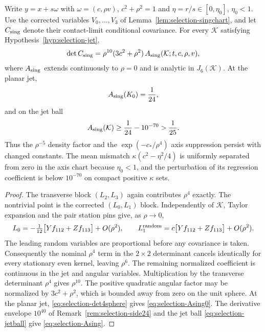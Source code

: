 \begin{lemma}\label{lem:selection-singfactor}
Write $y=x+s\omega$ with $\omega=(c,\rho v)$, $c^2+\rho^2=1$ and $\eta=r/s\in[0,\eta_0]$, $\eta_0<1$. Use the corrected variables $V_0,\dots,V_3$ of Lemma~\ref{lem:selection-singchart}, and let $C_{\rm sing}$ denote their contact-limit conditional covariance. For every $\mathcal K$ satisfying Hypothesis~\ref{hyp:selection-jet},
\begin{equation}\label{eq:selection-singfactor}
\det C_{\rm sing}=\rho^{10}(3c^2+\rho^2)\,A_{\rm sing}(\mathcal K;t,c,\rho,v),
\end{equation}
where $A_{\rm sing}$ extends continuously to $\rho=0$ and is analytic in $J_6(\mathcal K)$. At the planar jet,
\begin{equation}\label{eq:selection-Asing0}
A_{\rm sing}(K_0)=\frac1{24},
\end{equation}
and on the jet ball
\begin{equation}\label{eq:selection-Asing}
A_{\rm sing}(\mathcal K)\ge\frac1{24}-10^{-70}>\frac1{25}.
\end{equation}
Thus the $\rho^{-5}$ density factor and the $\exp(-c_*/\rho^4)$ axis suppression persist with changed constants. The mean mismatch $\kappa(c^2-\eta^2/4)$ is uniformly separated from zero in the axis chart because $\eta_0<1$, and the perturbation of its regression coefficient is below $10^{-70}$ on compact positive $\kappa$ sets.
\end{lemma}

\begin{proof}
The transverse block $(L_2,L_3)$ again contributes $\rho^4$ exactly. The nontrivial point is the corrected $(L_0,L_1)$ block. Independently of $\mathcal K$, Taylor expansion and the pair station pins give, as $\rho\to0$,
\begin{equation}\label{eq:selection-singlead}
L_0=-\tfrac1{12}\bigl[Yf_{112}+Zf_{113}\bigr]+O(\rho^2),\qquad L_1^{\rm random}=c\bigl[Yf_{112}+Zf_{113}\bigr]+O(\rho^2).
\end{equation}
The leading random variables are proportional before any covariance is taken. Consequently the nominal $\rho^4$ term in the $2\times2$ determinant cancels identically for every stationary even kernel, leaving $\rho^6$. The remaining normalized coefficient is continuous in the jet and angular variables. Multiplication by the transverse determinant $\rho^4$ gives $\rho^{10}$. The positive quadratic angular factor may be normalized by $3c^2+\rho^2$, which is bounded away from zero on the unit sphere. At the planar jet, \eqref{eq:selection-det4sphere} gives \eqref{eq:selection-Asing0}. The derivative envelope $10^{40}$ of Remark~\ref{rem:selection-side24} and the jet ball \eqref{eq:selection-jetball} give \eqref{eq:selection-Asing}.
\end{proof}

